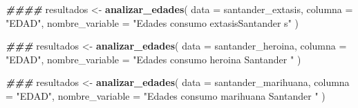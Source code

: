 \documentclass[
]{article}
\newenvironment{Shaded}{\begin{snugshade}}{\end{snugshade}}
\newcommand{\AttributeTok}[1]{\textcolor[rgb]{0.13,0.29,0.53}{#1}}
\newcommand{\DocumentationTok}[1]{\textcolor[rgb]{0.56,0.35,0.01}{\textbf{\textit{#1}}}}
\newcommand{\FunctionTok}[1]{\textcolor[rgb]{0.13,0.29,0.53}{\textbf{#1}}}
\newcommand{\NormalTok}[1]{#1}
\newcommand{\OtherTok}[1]{\textcolor[rgb]{0.56,0.35,0.01}{#1}}
\newcommand{\StringTok}[1]{\textcolor[rgb]{0.31,0.60,0.02}{#1}}
\begin{document}
\begin{Shaded}
\begin{Highlighting}[]
\DocumentationTok{\#\#\#\#}
\NormalTok{resultados }\OtherTok{\textless{}{-}} \FunctionTok{analizar\_edades}\NormalTok{(}
  \AttributeTok{data =}\NormalTok{ santander\_extasis,}
  \AttributeTok{columna =} \StringTok{"EDAD"}\NormalTok{, }
  \AttributeTok{nombre\_variable =} \StringTok{"Edades consumo extasisSantander s"}  
\NormalTok{)}

\DocumentationTok{\#\#\#}
\NormalTok{resultados }\OtherTok{\textless{}{-}} \FunctionTok{analizar\_edades}\NormalTok{(}
  \AttributeTok{data =}\NormalTok{ santander\_heroina,}
  \AttributeTok{columna =} \StringTok{"EDAD"}\NormalTok{, }
  \AttributeTok{nombre\_variable =} \StringTok{"Edades consumo heroina Santander "}  
\NormalTok{)}

\DocumentationTok{\#\#\#}
\NormalTok{resultados }\OtherTok{\textless{}{-}} \FunctionTok{analizar\_edades}\NormalTok{(}
  \AttributeTok{data =}\NormalTok{ santander\_marihuana,}
  \AttributeTok{columna =} \StringTok{"EDAD"}\NormalTok{, }
  \AttributeTok{nombre\_variable =} \StringTok{"Edades consumo marihuana Santander "}  
\NormalTok{)}
\end{Highlighting}
\end{Shaded}
\end{document}

